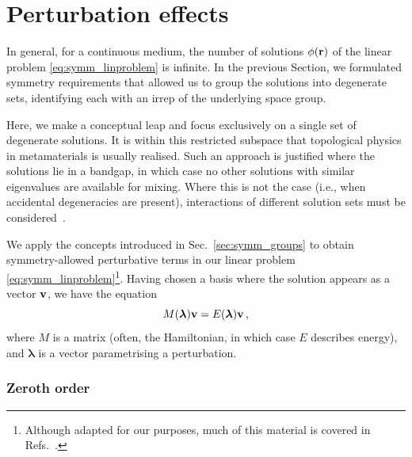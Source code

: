 \section{Perturbation effects} \label{sec:symm_perts}

In general, for a continuous medium, the number of solutions $\phi(\vb{r})$ of the linear problem \eqref{eq:symm_linproblem} is infinite. In the previous Section, we formulated symmetry requirements that allowed us to group the solutions into degenerate sets, identifying each with an irrep of the underlying space group. 

Here, we make a conceptual leap and focus exclusively on a single set of degenerate solutions. It is within this restricted subspace that topological physics in metamaterials is usually realised. Such an approach is justified where the solutions lie in a bandgap, in which case no other solutions with similar eigenvalues are available for mixing. Where this is not the case (i.e., when accidental degeneracies are present), interactions of different solution sets must be considered~\cite{Benalcazar_2020, Cerjan_2020}.

We apply the concepts introduced in Sec.~\ref{sec:symm_groups} to obtain symmetry-allowed perturbative terms in our linear problem \eqref{eq:symm_linproblem}\footnote{Although adapted for our purposes, much of this material is covered in Refs.~\cite{Saba_2017, Saba_2020}.}.
Having chosen a basis where the solution appears as a vector $\vb{v}$, we have the equation
\begin{equation} \label{seq:eigenproblem}
M(\boldsymbol{\lambda})  \vb{v} = E(\boldsymbol{\lambda}) \vb{v} \,,
\end{equation}
where $M$ is a matrix (often, the Hamiltonian, in which case $E$ describes energy), and $\boldsymbol{\lambda}$ is a vector parametrising a perturbation.
\\

\subsubsection{Zeroth order} 


